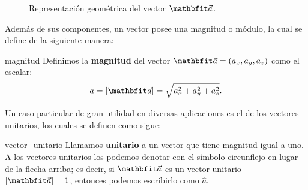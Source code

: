 \begin{figure}
    \centering
    \caption{Representación geométrica del vector $\veca$.}
    \label{fig:componentes}
\end{figure}

Además de sus componentes, un vector posee una magnitud o módulo, la cual se define de la siguiente manera:

\begin{definition}{}{magnitud}
    Definimos la \textbf{magnitud} del vector $\veca = (a_x, a_y, a_z)$ como el escalar:
    $$a = |\veca| = \sqrt{a_x^2 + a_y^2 + a_z^2}.$$
\end{definition}

Un caso particular de gran utilidad en diversas aplicaciones es el de los vectores unitarios, los cuales se definen como sigue:

\begin{definition}{}{vector_unitario}
    Llamamos \textbf{unitario} a un vector que tiene magnitud igual a uno. A los vectores unitarios los podemos denotar con el símbolo circunflejo en lugar de la flecha arriba; es decir, si $\veca$ es un vector unitario $|\veca| = 1$, entonces podemos escribirlo como $\hat{a}$.
\end{definition}


